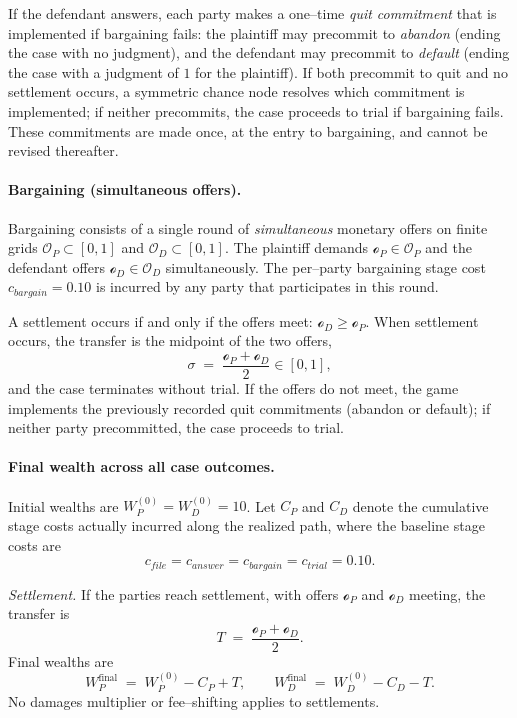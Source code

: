 \documentclass{article}
\begin{document}
If the defendant answers, each party makes a one–time \emph{quit commitment} that is implemented if bargaining fails: the plaintiff may precommit to \emph{abandon} (ending the case with no judgment), and the defendant may precommit to \emph{default} (ending the case with a judgment of $1$ for the plaintiff). If both precommit to quit and no settlement occurs, a symmetric chance node resolves which commitment is implemented; if neither precommits, the case proceeds to trial if bargaining fails. These commitments are made once, at the entry to bargaining, and cannot be revised thereafter.

\paragraph{Bargaining (simultaneous offers).}
Bargaining consists of a single round of \emph{simultaneous} monetary offers on finite grids $\mathcal{O}_P\subset[0,1]$ and $\mathcal{O}_D\subset[0,1]$. The plaintiff demands $\mathcal{o}_P\in\mathcal{O}_P$ and the defendant offers $\mathcal{o}_D\in\mathcal{O}_D$ simultaneously. The per–party bargaining stage cost $c_{bargain}=0.10$ is incurred by any party that participates in this round.

A settlement occurs if and only if the offers meet: $\mathcal{o}_D\ge \mathcal{o}_P$. When settlement occurs, the transfer is the midpoint of the two offers,
\[
\sigma \;=\; \frac{\mathcal{o}_P+\mathcal{o}_D}{2}\in[0,1],
\]
and the case terminates without trial. If the offers do not meet, the game implements the previously recorded quit commitments (abandon or default); if neither party precommitted, the case proceeds to trial.

\paragraph{Final wealth across all case outcomes.}
Initial wealths are $W_P^{(0)}=W_D^{(0)}=10$. Let $C_P$ and $C_D$ denote the cumulative stage costs actually incurred along the realized path, where the baseline stage costs are
\[
c_{file}=c_{answer}=c_{bargain}=c_{trial}=0.10.
\]

\emph{Settlement.} If the parties reach settlement, with offers $\mathcal{o}_P$ and $\mathcal{o}_D$ meeting, the transfer is
\[
T \;=\; \frac{\mathcal{o}_P+\mathcal{o}_D}{2}.
\]
Final wealths are
\[
W_P^{\mathrm{final}} \;=\; W_P^{(0)} - C_P + T,
\qquad
W_D^{\mathrm{final}} \;=\; W_D^{(0)} - C_D - T.
\]
No damages multiplier or fee–shifting applies to settlements.
\end{document}
